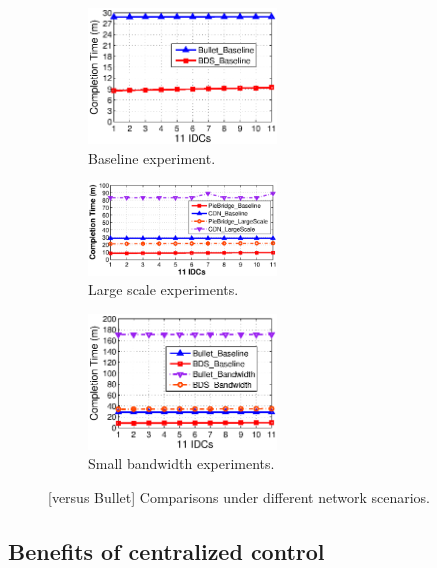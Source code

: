 \begin{figure}[t] %
        \centering
        \begin{subfigure}[b]{0.3\textwidth}
                \centering
                \includegraphics[width=50mm]{images/Test1.eps}
                \caption{Baseline experiment.}
                \label{fig:cdn:baseline}
        \end{subfigure}
        \begin{subfigure}[b]{0.3\textwidth}
                \centering
                \includegraphics[width=50mm]{images/Test2.eps}
                \caption{Large scale experiments.}
                \label{fig:cdn:scale}
        \end{subfigure}
        \begin{subfigure}[b]{0.3\textwidth}
                \centering
                \includegraphics[width=50mm]{images/Test3.eps}
                \caption{Small bandwidth experiments.}
                \label{fig:cdn:bw}
        \end{subfigure}
        \caption{[\name versus Bullet] Comparisons under different network scenarios.}
        \label{fig:versusCDN}
\vspace{-0.4cm}
\end{figure}


\subsection{Benefits of centralized control}
\label{subsec:evaluation:centralized}

